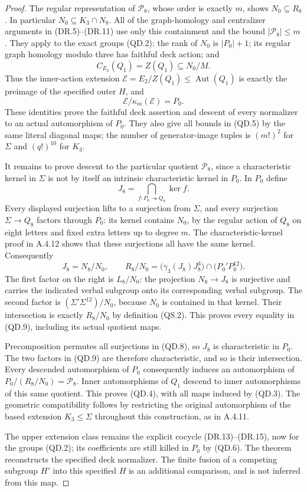 \begin{proof}
The regular representation of $\mathcal P_8$, whose order is
exactly $m$, shows $N_0\subseteq R_8$.  In particular
$N_0\subseteq K_3\cap N_8$.  All of the graph-homology and
centralizer arguments in (DR.5)--(DR.11) use only this
containment and the bound $|\mathcal P_8|\leq m$.
They apply to the exact groups (QD.2): the rank of $N_0$ is
$|P_0|+1$; its regular graph homology modulo three has faithful
deck action; and
\[
 C_{E_2}(Q_1)=Z(Q_1)\subseteq N_0/M.
                                                        \tag{QD.6}
\]
Thus the inner-action extension
$\mathcal E=E_2/Z(Q_1)\leq\operatorname{Aut}(Q_1)$ is
exactly the preimage of the specified outer $H$, and
\[
 \mathcal E/\kappa_m(\mathcal E)=P_0.                    \tag{QD.7}
\]
These identities prove the faithful deck assertion and descent
of every normalizer to an actual automorphism of $P_0$.
They also give all bounds in (QD.5) by the same literal
diagonal maps; the number of generator-image tuples is
$(m!)^2$ for $\Sigma$ and $(q!)^{10}$ for $K_3$.

It remains to prove descent to the particular quotient
$\mathcal P_8$, since a characteristic kernel in $\Sigma$
is not by itself an intrinsic characteristic kernel in $P_0$.
In $P_0$ define
\[
 J_8=\bigcap_{f:P_0\twoheadrightarrow Q_8}\ker f.
                                                        \tag{QD.8}
\]
Every displayed surjection lifts to a surjection from $\Sigma$,
and every surjection $\Sigma\to Q_8$ factors through $P_0$:
its kernel contains $N_0$, by the regular action of $Q_8$
on eight letters and fixed extra letters up to degree $m$.
The characteristic-kernel proof in A.4.12 shows that these
surjections all have the same kernel.  Consequently
\[
 J_8=N_8/N_0,
 \qquad
 R_8/N_0=
 \bigl(\gamma_3(J_8)J_8^3\bigr)
      \cap\bigl(P_0'P_0^{12}\bigr).                      \tag{QD.9}
\]
The first factor on the right is $L_8/N_0$: the projection
$N_8\to J_8$ is surjective and carries the indicated verbal
subgroup onto its corresponding verbal subgroup.  The second
factor is $(\Sigma'\Sigma^{12})/N_0$, because $N_0$ is
contained in that kernel.  Their intersection is exactly
$R_8/N_0$ by definition (QS.2).  This proves every equality in
(QD.9), including its actual quotient maps.

Precomposition permutes all surjections in (QD.8), so $J_8$
is characteristic in $P_0$.  The two factors in (QD.9) are
therefore characteristic, and so is their intersection.
Every descended automorphism of $P_0$ consequently induces
an automorphism of
$P_0/(R_8/N_0)=\mathcal P_8$.  Inner automorphisms of $Q_1$
descend to inner automorphisms of this same quotient.  This
proves (QD.4), with all maps induced by (QD.3).
The geometric compatibility follows by restricting the
original automorphism of the based extension
$K_3\leq\Sigma$ throughout this construction, as in A.4.11.

The upper extension class remains the explicit cocycle
(DR.13)--(DR.15), now for the groups (QD.2); its coefficients
are still killed in $P_0$ by (QD.6).  The theorem reconstructs
the specified deck normalizer.  The finite fusion of a
competing subgroup $H'$ into this specified $H$ is an
additional comparison, and is not inferred from this map.
\end{proof}
